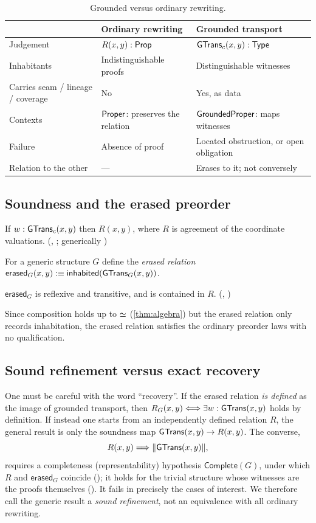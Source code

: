 \begin{table}[t]
\centering\small
\caption{Grounded versus ordinary rewriting.}\label{tab:compare}
\begin{tabularx}{\textwidth}{@{}lYY@{}}
\toprule
 & Ordinary rewriting & Grounded transport \\
\midrule
Judgement & $R(x,y) : \mathsf{Prop}$ & $\mathsf{GTrans}_c(x,y) : \mathsf{Type}$ \\
Inhabitants & Indistinguishable proofs & Distinguishable witnesses \\
Carries seam / lineage / coverage & No & Yes, as data \\
Contexts & $\mathsf{Proper}$: preserves the relation & $\mathsf{GroundedProper}$: maps witnesses \\
Failure & Absence of proof & Located obstruction, or open obligation \\
Relation to the other & --- & Erases to it; not conversely \\
\bottomrule
\end{tabularx}
\end{table}

\subsection{Soundness and the erased preorder}
\begin{theorem}\label{thm:sound}
If $w : \mathsf{GTrans}_c(x,y)$ then $R(x,y)$, where $R$ is agreement of the coordinate valuations. (, ; generically )
\end{theorem}
For a generic structure $G$ define the \emph{erased relation} $\mathsf{erased}_G(x,y) :\equiv \mathsf{inhabited}(\mathsf{GTrans}_G(x,y))$.
\begin{theorem}\label{thm:preorder}
$\mathsf{erased}_G$ is reflexive and transitive, and is contained in $R$. (, )
\end{theorem}
Since composition holds up to $\mathrel{\simeq}$ (\cref{thm:algebra}) but the erased relation only records inhabitation, the erased relation satisfies the ordinary preorder laws with no qualification.

\subsection{Sound refinement versus exact recovery}
One must be careful with the word ``recovery''. If the erased relation \emph{is defined} as the image of grounded transport, then $R_G(x,y) \Longleftrightarrow \exists w : \mathsf{GTrans}(x,y)$ holds by definition. If instead one starts from an independently defined relation $R$, the general result is only the soundness map $\mathsf{GTrans}(x,y) \to R(x,y)$. The converse,
\[
R(x,y) \Longrightarrow \|\mathsf{GTrans}(x,y)\|,
\]
requires a completeness (representability) hypothesis $\mathsf{Complete}(G)$, under which $R$ and $\mathsf{erased}_G$ coincide (); it holds for the trivial structure whose witnesses are the proofs themselves (). It fails in precisely the cases of interest. We therefore call the generic result a \emph{sound refinement}, not an equivalence with all ordinary rewriting.

